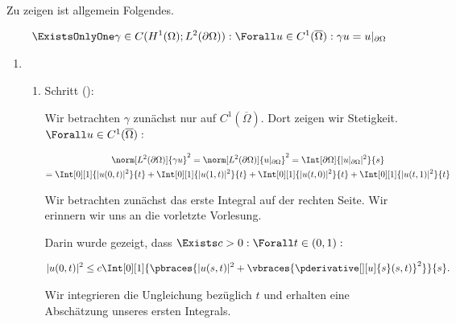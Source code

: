 \begin{solution}

Zu zeigen ist allgemein Folgendes.

\begin{align*}
  \ExistsOnlyOne \gamma \in C
  (
    H^1(\Omega);
    L^2(\partial \Omega)
  ):
  \Forall u \in C^1(\overline{\Omega}):
  \gamma u = u|_{\partial \Omega}
\end{align*}

\begin{enumerate}[label = \textbf{\alph*)}]

  \item

  \begin{enumerate}[label = \arabic*.]

    \item Schritt ():

    Wir betrachten $\gamma$ zunächst nur auf $C^1(\overline{\Omega})$.
    Dort zeigen wir Stetigkeit.
    $\Forall u \in C^1(\overline{\Omega}):$

    \begin{multline*}
      \norm[L^2(\partial \Omega)]{\gamma u}^2
      =
      \norm[L^2(\partial \Omega)]{u|_{\partial \Omega}}^2
      =
      \Int[\partial \Omega]{|u|_{\partial \Omega}|^2}{s} \\
      =
      \Int[0][1]{|u(0, t)|^2}{t}
      +
      \Int[0][1]{|u(1, t)|^2}{t}
      +
      \Int[0][1]{|u(t, 0)|^2}{t}
      +
      \Int[0][1]{|u(t, 1)|^2}{t}
    \end{multline*}

    Wir betrachten zunächst das erste Integral auf der rechten Seite.
    Wir erinnern wir uns an die vorletzte Vorlesung.


    Darin wurde gezeigt, dass $\Exists c > 0: \Forall t \in (0, 1):$

    \begin{align*}
      |u(0, t)|^2
      \leq
      c
      \Int[0][1]
      {
        \pbraces
        {
          |u(s, t)|^2
          +
          \vbraces
          {
            \pderivative[][u]{s}(s, t)
          }^2
        }
      }{s}.
    \end{align*}

    Wir integrieren die Ungleichung bezüglich $t$ und erhalten eine Abschätzung unseres ersten Integrals.


\end{enumerate}
\end{enumerate}
\end{solution}
